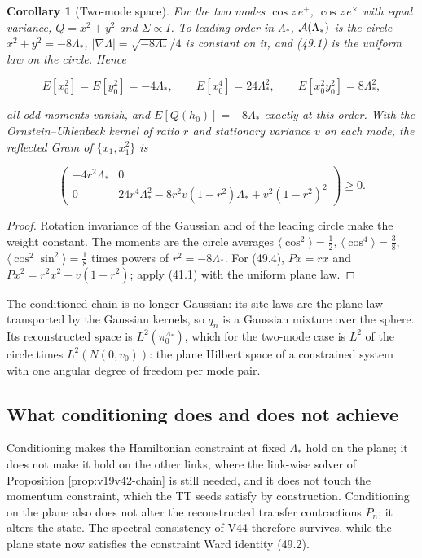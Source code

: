 \documentclass[11pt]{article}
\newtheorem{corollary}[theorem]{Corollary}
\theoremstyle{remark}
\begin{document}
\begin{corollary}[Two-mode space]
\label{cor:v19v46-two-mode}
For the two modes \(\cos z\,e^+\), \(\cos z\,e^\times\) with equal
variance, \(Q=x^2+y^2\) and \(\Sigma\propto I\).  To leading order in
\(\Lambda_*\), \({\cal A}(\Lambda_*)\) is the circle \(x^2+y^2=-8\Lambda_*\),
\(|\nabla\Lambda|=\sqrt{-8\Lambda_*}/4\) is constant on it, and
(49.1) is the uniform law on the circle.  Hence

\[
 E[x_0^2]=E[y_0^2]=-4\Lambda_*,\qquad
 E[x_0^4]=24\Lambda_*^2,\qquad
 E[x_0^2y_0^2]=8\Lambda_*^2,                                         \tag{49.3}
\]

all odd moments vanish, and \(E[Q(h_0)]=-8\Lambda_*\) exactly at this
order.  With the Ornstein--Uhlenbeck kernel of ratio \(r\) and
stationary variance \(v\) on each mode, the reflected Gram of
\(\{x_1,x_1^2\}\) is

\[
 \begin{pmatrix}
  -4r^2\Lambda_*&0\\
  0&24r^4\Lambda_*^2-8r^2v(1-r^2)\Lambda_*+v^2(1-r^2)^2
 \end{pmatrix}\geq0.                                                 \tag{49.4}
\]
\end{corollary}

\begin{proof}
Rotation invariance of the Gaussian and of the leading circle make the
weight constant.  The moments are the circle averages
\(\langle\cos^2\rangle=\tfrac12\), \(\langle\cos^4\rangle=\tfrac38\),
\(\langle\cos^2\sin^2\rangle=\tfrac18\) times powers of
\(r^2=-8\Lambda_*\).  For (49.4), \(Px=rx\) and
\(Px^2=r^2x^2+v(1-r^2)\); apply (41.1) with the uniform plane law.
\end{proof}

The conditioned chain is no longer Gaussian: its site laws are the
plane law transported by the Gaussian kernels, so \(q_n\) is a
Gaussian mixture over the sphere.  Its reconstructed space is
\(L^2(\pi_0^{\Lambda_*})\), which for the two-mode case is
\(L^2\) of the circle times \(L^2(N(0,v_0))\): the plane Hilbert space
of a constrained system with one angular degree of freedom per mode
pair.

\subsection{What conditioning does and does not achieve}

Conditioning makes the Hamiltonian constraint at fixed \(\Lambda_*\)
hold on the plane; it does not make it hold on the other links, where
the link-wise solver of Proposition \ref{prop:v19v42-chain} is still
needed, and it does not touch the momentum constraint, which the TT
seeds satisfy by construction.  Conditioning on the plane also does
not alter the reconstructed transfer contractions \(P_n\); it alters the
state.  The spectral consistency of V44 therefore survives, while the
plane state now satisfies the constraint Ward identity (49.2).
\end{document}

